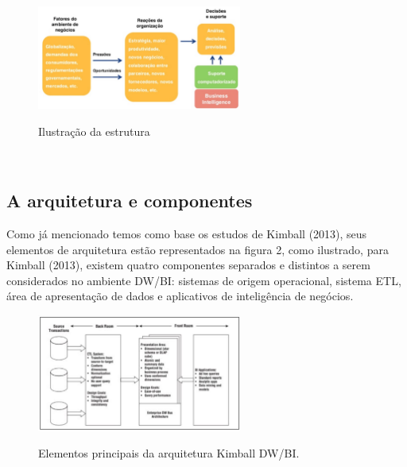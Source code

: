 \begin{figure}[H]
	\vspace*{0,2cm}
    \centering
    \caption{Ilustra\c{c}\~{a}o da estrutura}
    \includegraphics[width=0.6\textwidth]{./04-figuras/figura-01}
    \label{fig:ilustfig01}
\end{figure}
\vspace*{-0,9cm}
{\raggedright {}}\\

\subsection{A arquitetura e componentes}

Como j\'{a} mencionado temos como base os estudos de Kimball (2013), seus elementos de arquitetura est\~{a}o representados na figura 2, como ilustrado, para Kimball (2013), existem quatro componentes separados e distintos a serem considerados no ambiente DW/BI: sistemas de origem operacional, sistema ETL, \'{a}rea de apresenta\c{c}\~{a}o de dados e aplicativos de inteligência de negócios.

\begin{figure}[H]
	\vspace*{0,2cm}
    \centering
    \caption{Elementos principais da arquitetura Kimball DW/BI.}
    \includegraphics[width=0.6\textwidth]{./04-figuras/figura-02}
    \label{fig:ilustfig02}
\end{figure}
\vspace*{-0,9cm}
{\raggedright {}}\\


